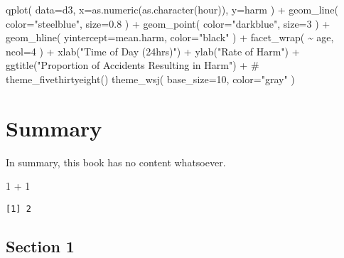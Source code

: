\documentclass[
  letterpaper,
  DIV=11,
  numbers=noendperiod,
  oneside]{scrreprt}
\newenvironment{Shaded}{\begin{snugshade}}{\end{snugshade}}
\newcommand{\AttributeTok}[1]{\textcolor[rgb]{0.40,0.45,0.13}{#1}}
\newcommand{\CommentTok}[1]{\textcolor[rgb]{0.37,0.37,0.37}{#1}}
\newcommand{\DecValTok}[1]{\textcolor[rgb]{0.68,0.00,0.00}{#1}}
\newcommand{\FloatTok}[1]{\textcolor[rgb]{0.68,0.00,0.00}{#1}}
\newcommand{\FunctionTok}[1]{\textcolor[rgb]{0.28,0.35,0.67}{#1}}
\newcommand{\NormalTok}[1]{\textcolor[rgb]{0.00,0.23,0.31}{#1}}
\newcommand{\SpecialCharTok}[1]{\textcolor[rgb]{0.37,0.37,0.37}{#1}}
\newcommand{\StringTok}[1]{\textcolor[rgb]{0.13,0.47,0.30}{#1}}
\begin{document}
\begin{Shaded}
\begin{Highlighting}[]
\FunctionTok{qplot}\NormalTok{( }\AttributeTok{data=}\NormalTok{d3, }\AttributeTok{x=}\FunctionTok{as.numeric}\NormalTok{(}\FunctionTok{as.character}\NormalTok{(hour)), }\AttributeTok{y=}\NormalTok{harm ) }\SpecialCharTok{+} 
  \FunctionTok{geom\_line}\NormalTok{( }\AttributeTok{color=}\StringTok{"steelblue"}\NormalTok{, }\AttributeTok{size=}\FloatTok{0.8}\NormalTok{ ) }\SpecialCharTok{+} 
  \FunctionTok{geom\_point}\NormalTok{( }\AttributeTok{color=}\StringTok{"darkblue"}\NormalTok{, }\AttributeTok{size=}\DecValTok{3}\NormalTok{ ) }\SpecialCharTok{+} 
  \FunctionTok{geom\_hline}\NormalTok{( }\AttributeTok{yintercept=}\NormalTok{mean.harm, }\AttributeTok{color=}\StringTok{"black"}\NormalTok{ ) }\SpecialCharTok{+} 
  \FunctionTok{facet\_wrap}\NormalTok{( }\SpecialCharTok{\textasciitilde{}}\NormalTok{ age, }\AttributeTok{ncol=}\DecValTok{4}\NormalTok{ ) }\SpecialCharTok{+} 
  \FunctionTok{xlab}\NormalTok{(}\StringTok{"Time of Day (24hrs)"}\NormalTok{) }\SpecialCharTok{+} \FunctionTok{ylab}\NormalTok{(}\StringTok{"Rate of Harm"}\NormalTok{) }\SpecialCharTok{+}
  \FunctionTok{ggtitle}\NormalTok{(}\StringTok{"Proportion of Accidents Resulting in Harm"}\NormalTok{) }\SpecialCharTok{+}
  \CommentTok{\# theme\_fivethirtyeight() }
  \FunctionTok{theme\_wsj}\NormalTok{( }\AttributeTok{base\_size=}\DecValTok{10}\NormalTok{, }\AttributeTok{color=}\StringTok{"gray"}\NormalTok{ )}
\end{Highlighting}
\end{Shaded}


\hypertarget{summary-1}{%
\chapter{Summary}\label{summary-1}}

In summary, this book has no content whatsoever.

\begin{Shaded}
\begin{Highlighting}[]
\DecValTok{1} \SpecialCharTok{+} \DecValTok{1}
\end{Highlighting}
\end{Shaded}

\begin{verbatim}
[1] 2
\end{verbatim}

\hypertarget{section-1}{%
\section{Section 1}\label{section-1}}
\end{document}
